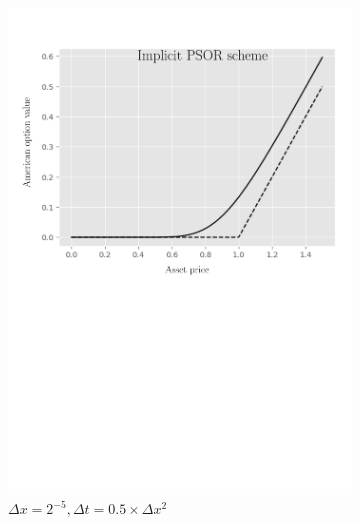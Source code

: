 \begin{figure}[H]
\begin{subfigure}{0.4\textwidth}
    \includegraphics[width=\textwidth]{chapters/chapter5/TestCase1ImplicitLCP.pdf}
    \caption{$\Delta{x}=2^{-5}, \Delta{t}=0.5\times\Delta{x}^2$}
    \label{fig:lcp:numericaresults:test_case_1_implicit}
  \end{subfigure}
  \hspace{0.5cm}
  \begin{subfigure}{0.4\textwidth}
    \label{fig:lcp:numericaresults:test_case_1_crank_nicholson}
    \centering

\end{subfigure}
\end{figure}

